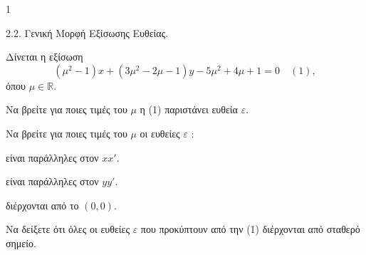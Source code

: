 \begin{ylh}{1}
    \item 2.2. Γενική Μορφή Εξίσωσης Ευθείας.
\end{ylh}
Δίνεται η εξίσωση
\[ (\mu^2-1)x+(3\mu^2-2\mu-1)y-5\mu^2+4\mu+1=0 \quad (1), \]
όπου $\mu \in \mathbb{R}$.
\begin{alist}
\item Να βρείτε για ποιες τιμές του $\mu$ η (1) παριστάνει ευθεία $\varepsilon$. 
\item Να βρείτε για ποιες τιμές του $\mu$ οι ευθείες $\varepsilon$ :
    \begin{rlist}
    \item είναι παράλληλες στον $xx'$. 
    \item είναι παράλληλες στον $yy'$. 
    \item διέρχονται από το $(0,0)$. 
    \end{rlist}
\item Να δείξετε ότι όλες οι ευθείες $\varepsilon$ που προκύπτουν από την (1) διέρχονται από σταθερό σημείο. 
\end{alist}